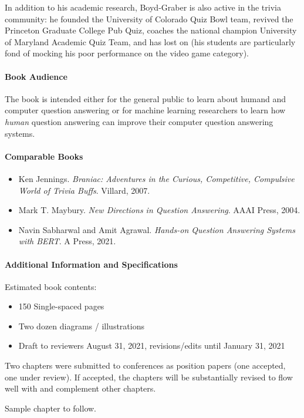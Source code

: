 In addition to his academic research, Boyd-Graber is also active in the trivia
community: he founded the University of Colorado Quiz Bowl team, revived the
Princeton Graduate College Pub Quiz, coaches the national champion University
of Maryland Academic Quiz Team, and has lost on \jeopardyp{} (his
students are particularly fond of mocking his poor performance on the
video game category).

\paragraph{Book Audience}

The book is intended either for the general public to learn about humand and computer
question answering or for machine learning researchers to learn
how \emph{human} question answering can improve their computer question
answering systems.

\paragraph{Comparable Books}

\begin{itemize}
        \item Ken Jennings.  \textit{Braniac: Adventures in the Curious,
        Competitive, Compulsive World of Trivia Buffs}.  Villard, 2007.

        \item Mark T. Maybury.  \textit{New Directions in Question
        Answering}.  AAAI Press, 2004.

        \item Navin Sabharwal and Amit Agrawal.  \textit{Hands-on Question
        Answering Systems with BERT}.  A Press, 2021.
\end{itemize}


\paragraph{Additional Information and Specifications}

Estimated book contents:
\begin{itemize}
  \item 150 Single-spaced pages
  \item Two dozen diagrams / illustrations
  \item Draft to reviewers August 31, 2021, revisions/edits until
    January 31, 2021
\end{itemize}

Two chapters were submitted to conferences as position papers (one
accepted, one under review).  If accepted, the chapters will be
substantially revised to flow well with and complement other
chapters.

Sample chapter to follow.